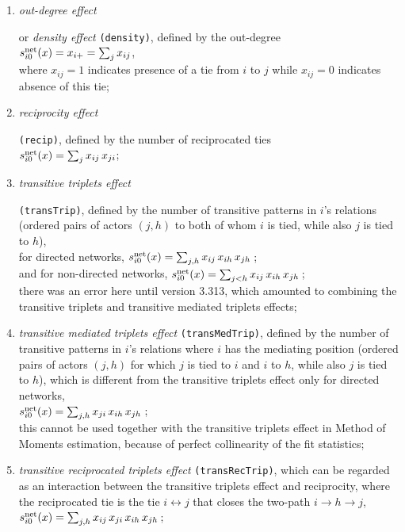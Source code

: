 \documentclass[a4paper,fleqn,11pt]{article}
\newcommand{\+}{\, + \,}
\newcommand{\vit}{\theenumi}
\begin{document}
\begin{enumerate}
 \item  \hypertarget{T_density}{{\em out-degree effect}} or
 \emph{density effect} \texttt{(density)},
 defined by the out-degree\\
 $s^{\rm net}_{i\vit}(x) = x_{i+} = \sum_j x_{ij}$,\\
 where $x_{ij}=1$ indicates presence of a tie from $i$ to $j$
 while $x_{ij}=0$ indicates absence of this tie;

 \item  \hypertarget{T_reci}{{\em reciprocity effect}} \texttt{(recip)},
 defined by the number of reciprocated ties\\
 $s^{\rm net}_{i\vit}(x) = \sum_j x_{ij}\,x_{ji}$;

 \item \hypertarget{T_transtrip}{{\em transitive triplets effect}}
 \texttt{(transTrip)},
   defined by the number of transitive
 patterns in $i$'s relations (ordered pairs of actors
 $(j,h)$ to both of whom $i$ is tied, while also $j$ is tied to $h$),\\
 for directed networks,
  $s^{\rm net}_{i\vit}(x) =  \sum_{j, h} x_{ij}\, x_{ih}\, x_{jh}\,$;\\
 and for non-directed networks,
 $s^{\rm net}_{i\vit}(x) =  \sum_{j < h} x_{ij}\, x_{ih}\, x_{jh}\,$;\\
 there was an error here until version 3.313,
 which amounted to combining the transitive triplets and transitive
 mediated triplets effects;

 \item {\em transitive mediated triplets effect} \texttt{(transMedTrip)},
 defined by the number of transitive patterns in $i$'s
 relations where $i$ has the mediating position
 (ordered pairs of actors
 $(j,h)$ for which $j$ is tied to $i$ and $i$ to $h$, while also $j$ is tied
 to $h$),  which is different from the transitive triplets effect
 only for directed networks,\\
  $s^{\rm net}_{i\vit}(x) =  \sum_{j, h} x_{ji}\, x_{ih}\, x_{jh}\,$;\\
 this cannot be used together with the transitive triplets effect in
 Method of Moments estimation, because of perfect collinearity
 of the fit statistics;


 \item
 {{\em transitive reciprocated triplets effect}}  \texttt{(transRecTrip)},
 which can be regarded as an interaction between the transitive triplets
 effect and reciprocity, where the reciprocated tie is the tie
 $i \leftrightarrow j$  that  closes the two-path
 $i \rightarrow h \rightarrow j$,\\
  $s^{\rm net}_{i\vit}(x) =  \sum_{j, h} x_{ij}\, x_{ji}\, x_{ih}\, x_{jh}\,$;


\end{enumerate}
\end{document}
